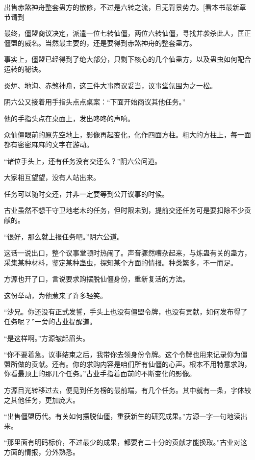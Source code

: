 
\begin{this_body}

出售赤煞神舟整套蛊方的散修，不过是六转之流，且无背景势力。[看本书最新章节请到

最终，僵盟商议决定，派遣一位七转仙僵，两位六转仙僵，寻找并袭杀此人，匡正僵盟的威名。当然最主要的，还是要得到赤煞神舟的整套蛊方。

事实上，僵盟已经得到了绝大部分，只剩下核心的几个仙蛊方，以及蛊虫如何配合运转的秘诀。

炎炉、地沟、赤煞神舟，这三件大事商议妥当，议事堂氛围为之一松。

阴六公又接着用手指头点点桌案：“下面开始商议其他任务。”

他的手指头点在桌面上，发出咚咚的声响。

众仙僵眼前的原先空地上，影像再起变化，化作四面方柱。粗大的方柱上，每一面都有密密麻麻的文字在游动。

“诸位手头上，还有任务没有交还么？”阴六公问道。

大家相互望望，没有人站出来。

任务可以随时交还，并非一定要等到公开议事的时候。

古业虽然不想干守卫地老木的任务，但时限未到，提前交还任务可是要扣除不少贡献的。

“很好，那么就上报任务吧。”阴六公道。

这话一说出口，整个议事堂顿时热闹了。声音骤然嘈杂起来，与炼蛊有关的蛊方，采集某种材料，鉴定某种蛊虫，探知某个方面的情报。种类繁多，不一而足。

方源也开了口，言说要求购摆脱仙僵身份，重新复活的方法。

这份举动，为他惹来了许多轻笑。

“沙兄。你还没有正式发誓，手头上也没有僵盟令牌，也没有贡献，如何发布得了任务呢？”一旁的古业提醒道。

“是这样啊。”方源皱起眉头。

“你不要着急。议事结束之后，我带你去领身份令牌。这个令牌也用来记录你为僵盟所做的贡献。还有。你的求购内容是咱们所有仙僵的心声。根本不用特意求购，你看最顶上的那几个任务。”古业手指着面前的不断变化的影像。

方源目光转移过去，便见到任务榜的最前端，有几个任务。其中就有一条，字体较之其他任务，更加庞大。

“出售僵盟历代。有关如何摆脱仙僵，重获新生的研究成果。”方源一字一句地读出来。

“那里面有明码标价，不过最少的成果，都要有二十分的贡献才能换取。”古业对这方面的情报，分外熟悉。


\end{this_body}
